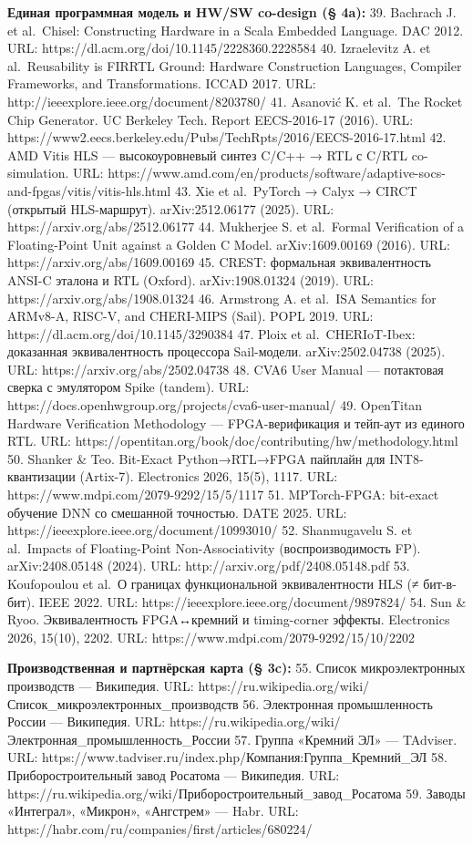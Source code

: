 \documentclass[
  russian,
]{article}
\begin{document}
\textbf{Единая программная модель и HW/SW co-design (§ 4a):} 39.
Bachrach J. et al.~Chisel: Constructing Hardware in a Scala Embedded
Language. DAC 2012. URL: https://dl.acm.org/doi/10.1145/2228360.2228584
40. Izraelevitz A. et al.~Reusability is FIRRTL Ground: Hardware
Construction Languages, Compiler Frameworks, and Transformations. ICCAD
2017. URL: http://ieeexplore.ieee.org/document/8203780/ 41. Asanović K.
et al.~The Rocket Chip Generator. UC Berkeley Tech. Report EECS-2016-17
(2016). URL:
https://www2.eecs.berkeley.edu/Pubs/TechRpts/2016/EECS-2016-17.html 42.
AMD Vitis HLS --- высокоуровневый синтез C/C++ → RTL с C/RTL
co-simulation. URL:
https://www.amd.com/en/products/software/adaptive-socs-and-fpgas/vitis/vitis-hls.html
43. Xie et al.~PyTorch → Calyx → CIRCT (открытый HLS-маршрут).
arXiv:2512.06177 (2025). URL: https://arxiv.org/abs/2512.06177 44.
Mukherjee S. et al.~Formal Verification of a Floating-Point Unit against
a Golden C Model. arXiv:1609.00169 (2016). URL:
https://arxiv.org/abs/1609.00169 45. CREST: формальная эквивалентность
ANSI-C эталона и RTL (Oxford). arXiv:1908.01324 (2019). URL:
https://arxiv.org/abs/1908.01324 46. Armstrong A. et al.~ISA Semantics
for ARMv8-A, RISC-V, and CHERI-MIPS (Sail). POPL 2019. URL:
https://dl.acm.org/doi/10.1145/3290384 47. Ploix et al.~CHERIoT-Ibex:
доказанная эквивалентность процессора Sail-модели. arXiv:2502.04738
(2025). URL: https://arxiv.org/abs/2502.04738 48. CVA6 User Manual ---
потактовая сверка с эмулятором Spike (tandem). URL:
https://docs.openhwgroup.org/projects/cva6-user-manual/ 49. OpenTitan
Hardware Verification Methodology --- FPGA-верификация и тейп-аут из
единого RTL. URL:
https://opentitan.org/book/doc/contributing/hw/methodology.html 50.
Shanker \& Teo. Bit-Exact Python→RTL→FPGA пайплайн для INT8-квантизации
(Artix-7). Electronics 2026, 15(5), 1117. URL:
https://www.mdpi.com/2079-9292/15/5/1117 51. MPTorch-FPGA: bit-exact
обучение DNN со смешанной точностью. DATE 2025. URL:
https://ieeexplore.ieee.org/document/10993010/ 52. Shanmugavelu S. et
al.~Impacts of Floating-Point Non-Associativity (воспроизводимость FP).
arXiv:2408.05148 (2024). URL: http://arxiv.org/pdf/2408.05148.pdf 53.
Koufopoulou et al.~О границах функциональной эквивалентности HLS (≠
бит-в-бит). IEEE 2022. URL:
https://ieeexplore.ieee.org/document/9897824/ 54. Sun \& Ryoo.
Эквивалентность FPGA↔кремний и timing-corner эффекты. Electronics 2026,
15(10), 2202. URL: https://www.mdpi.com/2079-9292/15/10/2202

\textbf{Производственная и партнёрская карта (§ 3c):} 55. Список
микроэлектронных производств --- Википедия. URL:
https://ru.wikipedia.org/wiki/Список\_микроэлектронных\_производств 56.
Электронная промышленность России --- Википедия. URL:
https://ru.wikipedia.org/wiki/Электронная\_промышленность\_России 57.
Группа «Кремний ЭЛ» --- TAdviser. URL:
https://www.tadviser.ru/index.php/Компания:Группа\_Кремний\_ЭЛ 58.
Приборостроительный завод Росатома --- Википедия. URL:
https://ru.wikipedia.org/wiki/Приборостроительный\_завод\_Росатома 59.
Заводы «Интеграл», «Микрон», «Ангстрем» --- Habr. URL:
https://habr.com/ru/companies/first/articles/680224/
\end{document}
